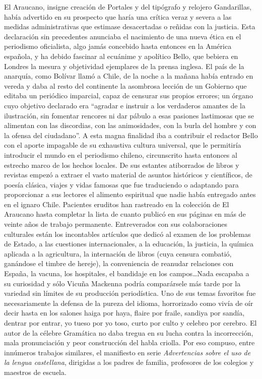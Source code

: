 \documentclass[10pt,twoside,openright]{memoir}
\begin{document}
El Araucano, insigne creación de Portales y del tipógrafo y relojero
Gandarillas, había advertido en su prospecto que haría una crítica veraz
y severa a las medidas administrativas que estimase desacertadas o
reñidas con la justicia. Esta declaración sin precedentes anunciaba el
nacimiento de una nueva ética en el periodismo oficialista, algo jamás
concebido hasta entonces en la América española, y ha debido fascinar al
ecuánime y apolítico Bello, que bebiera en Londres la mesura y
objetividad ejemplares de la prensa inglesa. El país de la anarquía,
como Bolívar llamó a Chile, de la noche a la mañana había entrado en
vereda y daba al resto del continente la asombrosa lección de un
Gobierno que editaba un periódico imparcial, capaz de censurar sus
propios errores; un órgano cuyo objetivo declarado era ``agradar e
instruir a los verdaderos amantes de la ilustración, sin fomentar
rencores ni dar pábulo a esas pasiones lastimosas que se alimentan con
las discordias, con las animosidades, con la burla del hombre y con la
ofensa del ciudadano''. A esta magna finalidad iba a contribuir el
redactor Bello con el aporte impagable de su exhaustiva cultura
universal, que le permitiría introducir el mundo en el periodismo
chileno, circunscrito hasta entonces al estrecho marco de los hechos
locales. De sus estantes atiborrados de libros y revistas empezó a
extraer el vasto material de asuntos históricos y científicos, de poesía
clásica, viajes y vidas famosas que fue traduciendo o adaptando para
proporcionar a sus lectores el alimento espiritual que nadie había
entregado antes en el ignaro Chile. Pacientes eruditos han rastreado en
la colección de El Araucano hasta completar la lista de cuanto publicó
en sus páginas en más de veinte años de trabajo permanente. Entreverados
con sus colaboraciones culturales están los incontables artículos que
dedicó al examen de los problemas de Estado, a las cuestiones
internacionales, a la educación, la justicia, la química aplicada a la
agricultura, la internación de libros (cuya censura combatió, ganándose
el timbre de hereje), la conveniencia de reanudar relaciones con España,
la vacuna, los hospitales, el bandidaje en los campos\ldots Nada escapaba a
su curiosidad y sólo Vicuña Mackenna podría comparársele más tarde por
la variedad sin límites de su producción periodística. Uno de sus temas
favoritos fue necesariamente la defensa de la pureza del idioma,
horrorizado como vivía de oír decir hasta en los salones haiga por haya,
flaire por fraile, sandiya por sandía, dentrar por entrar, yo tueso por
yo toso, curto por culto y celebro por cerebro. El autor de la célebre
Gramática no daba tregua en su lucha contra la incorrección, mala
pronunciación y peor construcción del habla criolla. Por eso compuso,
entre innúmeros trabajos similares, el manifiesto en serie
\emph{Advertencias sobre el uso de la lengua castellana}, dirigidas a
los padres de familia, profesores de los colegios y maestros de escuela.
\end{document}
